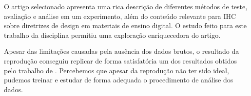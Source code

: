 \documentclass[12pt]{article}
\begin{document}
O artigo selecionado apresenta uma rica descrição de diferentes métodos de teste, avaliação e análise em um experimento, além do conteúdo relevante para IHC sobre diretrizes de design em materiais de ensino digital. O estudo feito para este trabalho da disciplina permitiu uma exploração enriquecedora do artigo.

Apesar das limitações causadas pela ausência dos dados brutos, o resultado da reprodução conseguiu replicar de forma satisfatória um dos resultados obtidos pelo trabalho de \cite{JIN2013248}. Percebemos que apesar da reprodução não ter sido ideal, pudemos treinar e estudar de forma adequada o procedimento de análise dos dados.



\end{document}
